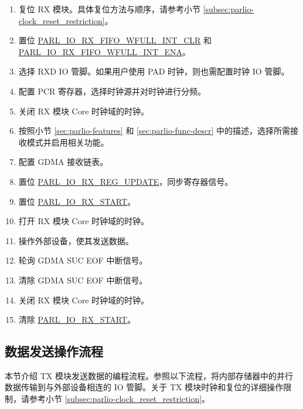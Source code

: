 \documentclass[main\_\_CN.tex]{subfiles}
\begin{document}
\begin{enumerate}
    \item 复位 RX 模块。具体复位方法与顺序，请参考小节 \ref{subsec:parlio-clock_reset_restriction}。
    \item 置位 \hyperref[fielddesc:PARLIORXFIFOWFULLINTCLR]{PARL\_IO\_RX\_FIFO\_WFULL\_INT\_CLR} 和 \hyperref[fielddesc:PARLIORXFIFOWFULLINTENA]{PARL\_IO\_RX\_FIFO\_WFULL\_INT\_ENA}。
    \item 选择 RXD IO 管脚。如果用户使用 PAD 时钟，则也需配置时钟 IO 管脚。
    \item 配置 PCR 寄存器，选择时钟源并对时钟进行分频。
    \item 关闭 RX 模块 Core 时钟域的时钟。
    \item 按照小节 \ref{sec:parlio-features} 和 \ref{sec:parlio-func-descr} 中的描述，选择所需接收模式并启用相关功能。
    \item 配置 GDMA 接收链表。
    \item 置位 \hyperref[fielddesc:PARLIORXREGUPDATE]{PARL\_IO\_RX\_REG\_UPDATE}，同步寄存器信号。
    \item 置位 \hyperref[fielddesc:PARLIORXSTART]{PARL\_IO\_RX\_START}。
    \item 打开 RX 模块 Core 时钟域的时钟。
    \item 操作外部设备，使其发送数据。
    \item 轮询 GDMA SUC EOF 中断信号。
    \item 清除 GDMA SUC EOF 中断信号。
    \item 关闭 RX 模块 Core 时钟域的时钟。
    \item 清除 \hyperref[fielddesc:PARLIORXSTART]{PARL\_IO\_RX\_START}。
\end{enumerate}

\subsection{数据发送操作流程}

本节介绍 TX 模块发送数据的编程流程。参照以下流程，将内部存储器中的并行数据传输到与外部设备相连的 IO 管脚。关于 TX 模块时钟和复位的详细操作限制，请参考小节 \ref{subsec:parlio-clock_reset_restriction}。
\end{document}

